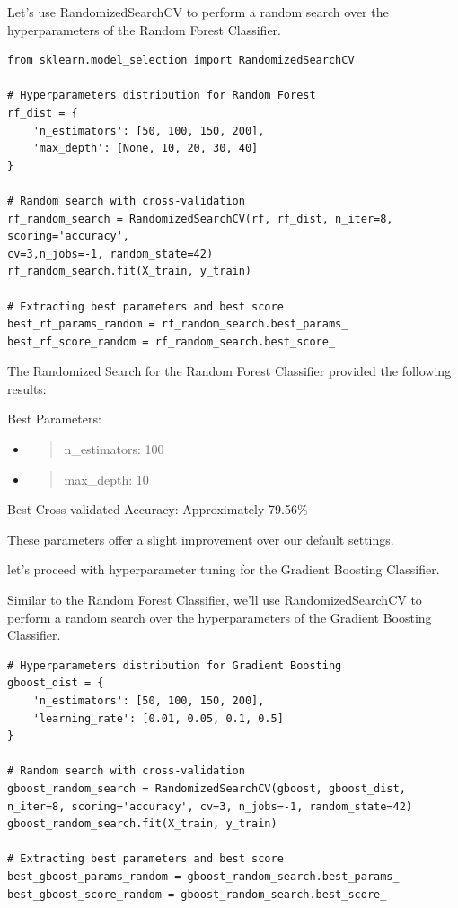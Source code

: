 \documentclass[]{article}
\begin{document}
Let's use RandomizedSearchCV to perform a random search over the
hyperparameters of the Random Forest Classifier.

\begin{verbatim}
from sklearn.model_selection import RandomizedSearchCV

# Hyperparameters distribution for Random Forest
rf_dist = {
    'n_estimators': [50, 100, 150, 200],
    'max_depth': [None, 10, 20, 30, 40]
}

# Random search with cross-validation
rf_random_search = RandomizedSearchCV(rf, rf_dist, n_iter=8, scoring='accuracy',
cv=3,n_jobs=-1, random_state=42)
rf_random_search.fit(X_train, y_train)

# Extracting best parameters and best score
best_rf_params_random = rf_random_search.best_params_
best_rf_score_random = rf_random_search.best_score_

\end{verbatim}

The Randomized Search for the Random Forest Classifier provided the
following results:

Best Parameters:

\begin{itemize}
\item
  \begin{quote}
  n\_estimators: 100
  \end{quote}
\item
  \begin{quote}
  max\_depth: 10
  \end{quote}
\end{itemize}

Best Cross-validated Accuracy: Approximately 79.56\%

These parameters offer a slight improvement over our default settings.

let's proceed with hyperparameter tuning for the Gradient Boosting
Classifier.

Similar to the Random Forest Classifier, we'll use RandomizedSearchCV to
perform a random search over the hyperparameters of the Gradient
Boosting Classifier.

\begin{verbatim}
# Hyperparameters distribution for Gradient Boosting
gboost_dist = {
    'n_estimators': [50, 100, 150, 200],
    'learning_rate': [0.01, 0.05, 0.1, 0.5]
}

# Random search with cross-validation
gboost_random_search = RandomizedSearchCV(gboost, gboost_dist, n_iter=8, scoring='accuracy', cv=3, n_jobs=-1, random_state=42)
gboost_random_search.fit(X_train, y_train)

# Extracting best parameters and best score
best_gboost_params_random = gboost_random_search.best_params_
best_gboost_score_random = gboost_random_search.best_score_

\end{verbatim}
\end{document}
